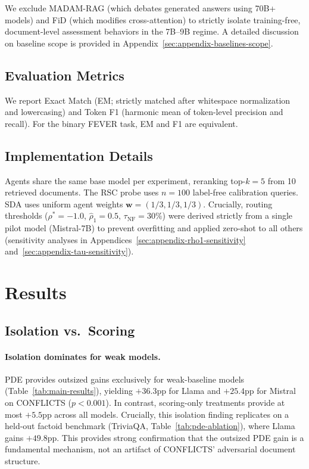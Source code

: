 \documentclass[11pt]{article}
\theoremstyle{definition}
\begin{document}
We exclude MADAM-RAG \citep{wang2025retrieval} (which debates generated answers using 70B+ models) and FiD \citep{izacard2021leveraging} (which modifies cross-attention) to strictly isolate training-free, document-level assessment behaviors in the 7B--9B regime. A detailed discussion on baseline scope is provided in Appendix~\ref{sec:appendix-baselines-scope}.

\subsection{Evaluation Metrics}
\label{subsec:metrics}

We report Exact Match (EM; strictly matched after whitespace normalization and lowercasing) and Token F1 (harmonic mean of token-level precision and recall). For the binary FEVER task, EM and F1 are equivalent.

\subsection{Implementation Details}
\label{subsec:implementation}

Agents share the same base model per experiment, reranking top-\(k{=}5\) from 10 retrieved documents. The RSC probe uses \(n{=}100\) label-free calibration queries. SDA uses uniform agent weights \(\mathbf{w} = (1/3, 1/3, 1/3)\). Crucially, routing thresholds (\(\rho^* = -1.0\), \(\hat{\rho}_1 = 0.5\), \(\tau_{\text{NF}} = 30\%\)) were derived strictly from a single pilot model (Mistral-7B) to prevent overfitting and applied zero-shot to all others (sensitivity analyses in Appendices~\ref{sec:appendix-rho1-sensitivity} and~\ref{sec:appendix-tau-sensitivity}).


\section{Results}
\label{sec:results}

\subsection{Isolation vs.\ Scoring}
\label{subsec:finding-isolation}

\paragraph{Isolation dominates for weak models.}
PDE provides outsized gains exclusively for weak-baseline models (Table~\ref{tab:main-results}), yielding \(+36.3\)pp for Llama and \(+25.4\)pp for Mistral on CONFLICTS (\(p < 0.001\)). In contrast, scoring-only treatments provide at most \(+5.5\)pp across all models. Crucially, this isolation finding replicates on a held-out factoid benchmark (TriviaQA, Table~\ref{tab:pde-ablation}), where Llama gains \(+49.8\)pp. This provides strong confirmation that the outsized PDE gain is a fundamental mechanism, not an artifact of CONFLICTS' adversarial document structure.
\end{document}
